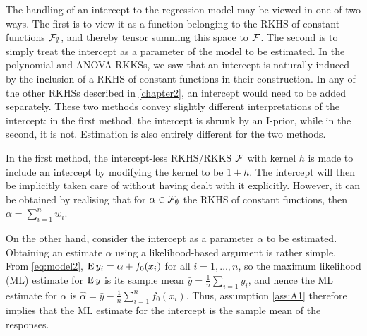 The handling of an intercept to the regression model may be viewed in one of two ways.
The first is to view it as a function belonging to the RKHS of constant functions ${\mathcal F}_\emptyset$, and thereby tensor summing this space to ${\mathcal F}$.
The second is to simply treat the intercept as a parameter of the model to be estimated.
In the polynomial and ANOVA RKKSs, we saw that an intercept is naturally induced by the inclusion of a RKHS of constant functions in their construction.
In any of the other RKHSs described in \cref{chapter2}, an intercept would need to be added separately.
These two methods convey slightly different interpretations of the intercept: in the first method, the intercept is shrunk by an I-prior, while in the second, it is not.
Estimation is also entirely different for the two methods.

In the first method, the intercept-less RKHS/RKKS ${\mathcal F}$ with kernel $h$ is made to include an intercept by modifying the kernel to be $1 + h$.
The intercept will then be implicitly taken care of without having dealt with it explicitly.
However, it can be obtained by realising that for $\alpha\in{\mathcal F}_\emptyset$ the RKHS of constant functions, then $\alpha = \sum_{i=1}^n w_i$.

On the other hand, consider the intercept as a parameter $\alpha$ to be estimated.
Obtaining an estimate $\alpha$ using a likelihood-based argument is rather simple.
From \cref{eq:model2}, $\operatorname{E} y_i = \alpha + f_0(x_i)$ for all $i=1,\dots,n$, so the maximum likelihood (ML) estimate for $\operatorname{E} y$ is its sample mean $\bar y = \frac{1}{n}\sum_{i=1} y_i$, and hence the ML estimate for $\alpha$ is $\hat\alpha = \bar y - \frac{1}{n} \sum_{i=1}^n f_0(x_i)$.
Thus, assumption \ref{ass:A1} therefore implies that the ML estimate for the intercept is the sample mean of the responses.


